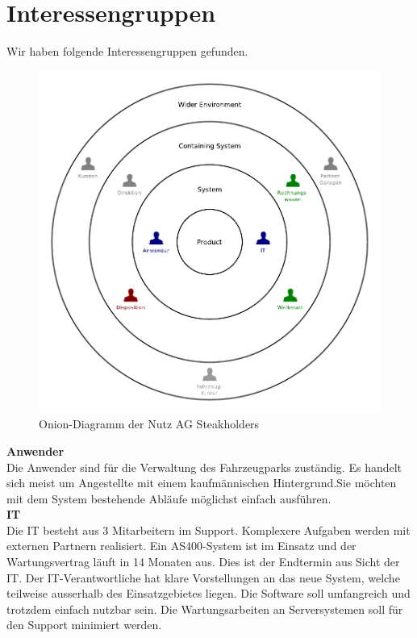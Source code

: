 \section{Interessengruppen}
%
Wir haben folgende Interessengruppen gefunden.
\begin{center}
  \begin{figure}[ht]
    \includegraphics{graphics/onion.pdf}
    \caption{Onion-Diagramm der Nutz AG Steakholders}
    \label{fig:awesome_image}
  \end{figure}
\end{center}
%
\textbf{Anwender}\\
Die Anwender sind für die Verwaltung des Fahrzeugparks zuständig. Es handelt sich meist um Angestellte mit einem kaufmännischen Hintergrund.Sie möchten mit dem System bestehende Abläufe möglichst einfach ausführen. 
\\[6ex]
%
\textbf{IT}\\
Die IT besteht aus 3 Mitarbeitern im Support. Komplexere Aufgaben werden mit externen Partnern realisiert. Ein AS400-System ist im Einsatz und der Wartungsvertrag läuft in 14 Monaten aus. Dies ist der Endtermin aus Sicht der IT. Der IT-Verantwortliche hat klare Vorstellungen an das neue System, welche teilweise ausserhalb des Einsatzgebietes liegen. Die Software soll umfangreich und trotzdem einfach nutzbar sein. Die Wartungsarbeiten an Serversystemen soll für den Support minimiert werden.
